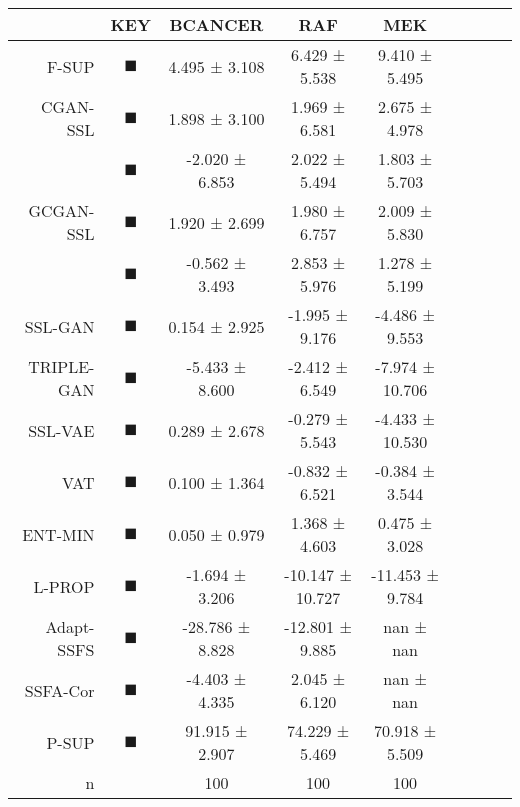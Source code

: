 \begin{tabular}{rcccccccc}
\toprule
{} &                                                                      KEY &          BCANCER &               RAF &              MEK \\
\midrule
F-SUP      &           \textcolor{FULLY_SUPERVISED_CLASSIFIER}{\LARGE $\blacksquare$} &    4.495 ± 3.108 &     6.429 ± 5.538 &    9.410 ± 5.495 \\
CGAN-SSL   &      \textcolor{CGAN_BASIC_SUPERVISED_CLASSIFIER}{\LARGE $\blacksquare$} &    1.898 ± 3.100 &     1.969 ± 6.581 &    2.675 ± 4.978 \\
           &   \textcolor{CGAN_BASIC_DJ_SUPERVISED_CLASSIFIER}{\LARGE $\blacksquare$} &   -2.020 ± 6.853 &     2.022 ± 5.494 &    1.803 ± 5.703 \\
GCGAN-SSL  &     \textcolor{CGAN_GUMBEL_SUPERVISED_CLASSIFIER}{\LARGE $\blacksquare$} &    1.920 ± 2.699 &     1.980 ± 6.757 &    2.009 ± 5.830 \\
           &  \textcolor{CGAN_GUMBEL_DJ_SUPERVISED_CLASSIFIER}{\LARGE $\blacksquare$} &   -0.562 ± 3.493 &     2.853 ± 5.976 &    1.278 ± 5.199 \\
SSL-GAN    &                               \textcolor{SSL_GAN}{\LARGE $\blacksquare$} &    0.154 ± 2.925 &    -1.995 ± 9.176 &   -4.486 ± 9.553 \\
TRIPLE-GAN &                            \textcolor{TRIPLE_GAN}{\LARGE $\blacksquare$} &   -5.433 ± 8.600 &    -2.412 ± 6.549 &  -7.974 ± 10.706 \\
SSL-VAE    &                               \textcolor{SSL_VAE}{\LARGE $\blacksquare$} &    0.289 ± 2.678 &    -0.279 ± 5.543 &  -4.433 ± 10.530 \\
VAT        &                                   \textcolor{VAT}{\LARGE $\blacksquare$} &    0.100 ± 1.364 &    -0.832 ± 6.521 &   -0.384 ± 3.544 \\
ENT-MIN    &                  \textcolor{ENTROPY_MINIMISATION}{\LARGE $\blacksquare$} &    0.050 ± 0.979 &     1.368 ± 4.603 &    0.475 ± 3.028 \\
L-PROP     &                     \textcolor{LABEL_PROPAGATION}{\LARGE $\blacksquare$} &   -1.694 ± 3.206 &  -10.147 ± 10.727 &  -11.453 ± 9.784 \\
Adapt-SSFS &                              \textcolor{ASSFSCMR}{\LARGE $\blacksquare$} &  -28.786 ± 8.828 &   -12.801 ± 9.885 &        nan ± nan \\
SSFA-Cor   &                              \textcolor{SFAMCAMT}{\LARGE $\blacksquare$} &   -4.403 ± 4.335 &     2.045 ± 6.120 &        nan ± nan \\
P-SUP      &         \textcolor{PARTIAL_SUPERVISED_CLASSIFIER}{\LARGE $\blacksquare$} &   91.915 ± 2.907 &    74.229 ± 5.469 &   70.918 ± 5.509 \\
n          &                                                                          &              100 &               100 &              100 \\
\bottomrule
\end{tabular}
